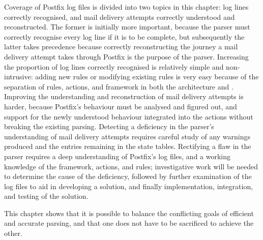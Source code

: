 Coverage of Postfix log files is divided into two topics in this chapter:
log lines correctly recognised, and mail delivery attempts correctly
understood and reconstructed.  The former is initially more important,
because the parser must correctly recognise every log line if it is to be
complete, but subsequently the latter takes precedence because correctly
reconstructing the journey a mail delivery attempt takes through Postfix is
the purpose of the parser.  Increasing the proportion of log lines
correctly recognised is relatively simple and non-intrusive: adding new
rules or modifying existing rules is very easy because of the separation of
rules, actions, and framework in both the architecture and \parsername{}.
Improving the understanding and reconstruction of mail delivery attempts is
harder, because Postfix's behaviour must be analysed and figured out, and
support for the newly understood behaviour integrated into the actions
without breaking the existing parsing.  Detecting a deficiency in the
parser's understanding of mail delivery attempts requires careful study of
any warnings produced and the entries remaining in the state tables.
Rectifying a flaw in the parser requires a deep understanding of Postfix's
log files, and a working knowledge of the framework, actions, and rules;
investigative work will be needed to determine the cause of the deficiency,
followed by further examination of the log files to aid in developing a
solution, and finally implementation, integration, and testing of the
solution.

This chapter shows that it is possible to balance the conflicting goals of
efficient and accurate parsing, and that one does not have to be sacrificed
to achieve the other.
